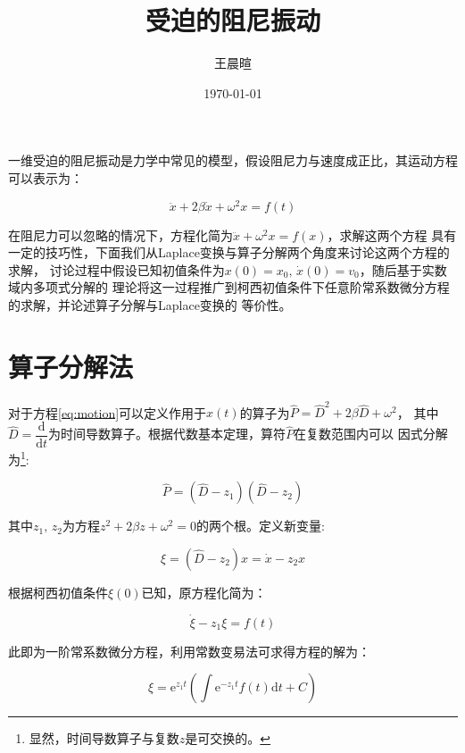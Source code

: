 \documentclass[11pt,a4paper]{ctexart}
\title{受迫的阻尼振动}
\author{王晨暄}
\date{\today}
\newcommand{\dd}{\mathrm{d}}
\begin{document}
\maketitle

一维受迫的阻尼振动是力学中常见的模型，假设阻尼力与速度成正比，其运动方程可以表示为：

\begin{equation}
    \ddot{x}+2\beta\dot{x}+\omega^2x = f(t)
    \label{eq:motion}
\end{equation}

在阻尼力可以忽略的情况下，方程化简为$\ddot{x}+\omega^2x = f(x)$，求解这两个方程
具有一定的技巧性，下面我们从Laplace变换与算子分解两个角度来讨论这两个方程的求解，
讨论过程中假设已知初值条件为$x(0)=x_0,\,\dot{x}(0)=v_0$，随后基于实数域内多项式分解的
理论将这一过程推广到柯西初值条件下任意阶常系数微分方程的求解，并论述算子分解与Laplace变换的
等价性。

\section{算子分解法}

对于方程\eqref{eq:motion}可以定义作用于$x(t)$的算子为$\hat{P}=\hat{D}^2+2\beta\hat{D}+\omega^2$，
其中$\hat{D}=\dfrac{\dd}{\dd t}$为时间导数算子。根据代数基本定理，算符$\hat{P}$在复数范围内可以
因式分解为\footnote{显然，时间导数算子与复数$z$是可交换的。}:

\begin{equation}
    \hat{P}=\left(\hat{D}-z_1\right)\left(\hat{D} - z_2\right)
\end{equation}

其中$z_1,\,z_2$为方程$z^2+2\beta z + \omega^2=0$的两个根。定义新变量:

\begin{equation}
    \xi=\left(\hat{D}-z_2\right)x = \dot{x}-z_2x
\end{equation}

根据柯西初值条件$\xi(0)$已知，原方程化简为：

\begin{equation}
    \dot{\xi}-z_1\xi=f(t)
\end{equation}

此即为一阶常系数微分方程，利用常数变易法可求得方程的解为：

\begin{equation}
    \xi = \mathrm{e}^{z_1t}\left(\int\mathrm{e}^{-z_1t}f(t)\dd t+C\right)
    \label{eq:solution_op}
\end{equation}
\end{document}
